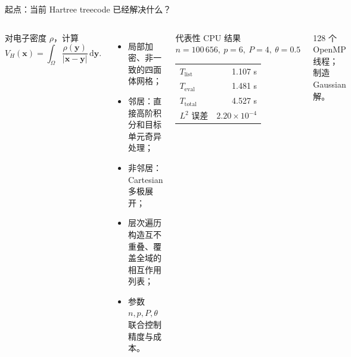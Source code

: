 \documentclass[aspectratio=169,11pt]{beamer}
\begin{document}
\begin{frame}{起点：当前 Hartree treecode 已经解决什么？}
  \begin{columns}[T,onlytextwidth]
      \small
      对电子密度 $\rho$，计算
      \[
        V_H(\bm x)=\int_\Omega\frac{\rho(\bm y)}{|\bm x-\bm y|}\,\mathrm d\bm y.
      \]
      \begin{itemize}\setlength\itemsep{0.42em}
        \item 局部加密、非一致的四面体网格；
        \item 邻居：直接高阶积分和目标单元奇异处理；
        \item 非邻居：Cartesian 多极展开；
        \item 层次遍历构造互不重叠、覆盖全域的相互作用列表；
        \item 参数 $n,p,P,\theta$ 联合控制精度与成本。
      \end{itemize}
      \begin{block}{代表性 CPU 结果}
        \centering\small
        $n=100\,656,\ p=6,\ P=4,\ \theta=0.5$
        \vspace{0.2cm}
        \begin{tabular}{lr}
          \toprule
          $T_{\mathrm{list}}$ & 1.107 s\\
          $T_{\mathrm{eval}}$ & 1.481 s\\
          $T_{\mathrm{total}}$ & 4.527 s\\
          $L^2$ 误差 & $2.20\times10^{-4}$\\
          \bottomrule
        \end{tabular}
      \end{block}
      \vspace{0.2cm}
      {\footnotesize\color{muted}128 个 OpenMP 线程；制造 Gaussian 解。}
  \end{columns}
\end{frame}
\end{document}
